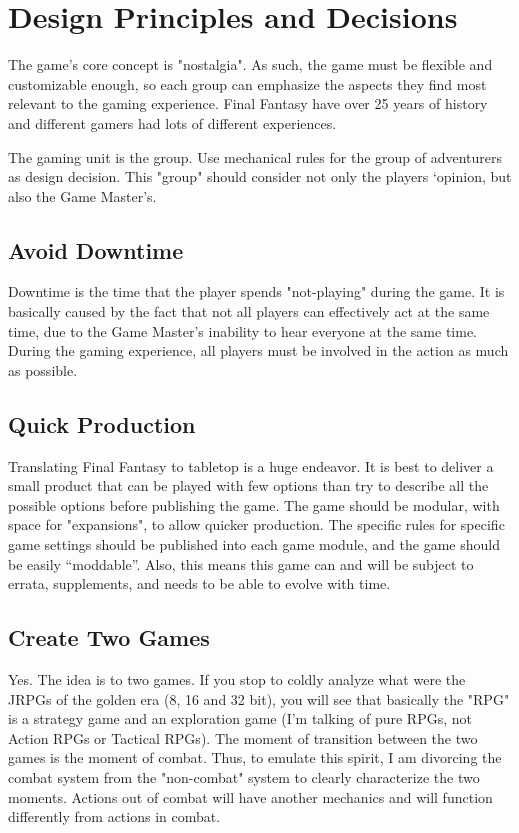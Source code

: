 \section{Design Principles and Decisions}
\begin{multicols}{2}
The game's core concept is "nostalgia". As
such, the game must be flexible and customizable
enough, so each group can emphasize the aspects
they find most relevant to the gaming experience.
Final Fantasy have over 25 years of history and
different gamers had lots of different experiences.

The gaming unit is the group. Use
mechanical rules for the group of adventurers as
design decision. This "group" should consider not
only the players ‘opinion, but also the Game
Master's.
\subsection{Avoid Downtime}
Downtime is the time that the player spends
"not-playing" during the game. It is basically
caused by the fact that not all players can
effectively act at the same time, due to the Game
Master’s inability to hear everyone at the same
time. During the gaming experience, all players
must be involved in the action as much as possible.
\subsection{Quick Production}
Translating Final Fantasy to tabletop is a
huge endeavor. It is best to deliver a small product
that can be played with few options than try to
describe all the possible options before publishing
the game. The game should be modular, with space
for "expansions", to allow quicker production. The
specific rules for specific game settings should be
published into each game module, and the game
should be easily “moddable”. Also, this means this
game can and will be subject to errata,
supplements, and needs to be able to evolve with
time.
\subsection{Create Two Games}
Yes. The idea is to two games. If you stop to
coldly analyze what were the JRPGs of the golden
era (8, 16 and 32 bit), you will see that basically
the "RPG" is a strategy game and an exploration
game (I'm talking of pure RPGs, not Action RPGs or
Tactical RPGs). The moment of transition between
the two games is the moment of combat. Thus, to
emulate this spirit, I am divorcing the combat
system from the "non-combat" system to clearly
characterize the two moments. Actions out of
combat will have another mechanics and will
function differently from actions in combat.

\end{multicols}
